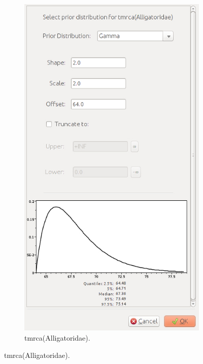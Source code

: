 {    \begin{figure}[htbp]
        \centering
        \begin{subfigure}[b]{0.33\textwidth}
            \includegraphics[width=\textwidth]{../screenshots/beauti-prior-alligatoridae.jpg}
            \caption{tmrca(Alligatoridae).}
            \label{fig:beautiPriorsAlligatoridae}
        \end{subfigure}

\end{figure}}
